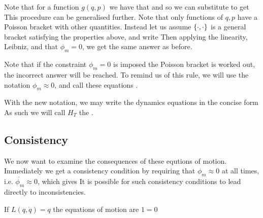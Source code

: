 \documentclass{article}
\begin{document}
Note that for a function $g(q,p)$ we have that 
and so we can substitute to get 
This procedure can be generalised further. Note that only functions of $q,p$ have a Poisson bracket with other quantities. Instead let us assume $\acomm[\cdot]{\cdot}$ is a general bracket satisfying the properties above, and write 
Then applying the linearity, Leibniz, and that $\phi_m = 0$, we get the same answer as before. 

\begin{remark}
Note that if the constraint $\phi_m = 0$ is imposed  the Poisson bracket is worked out, the incorrect answer will be reached. To remind us of this rule, we will use the notation $\phi_m \approx 0$, and call these equations . 
\end{remark}

With the new notation, we may write the dynamics equations in the concise form 
As such we will call $H_T$ the . \\
\subsection{Consistency}
We now want to examine the consequences of these equtions of motion. Immediately we get a consistency condition by requiring that $\phi_m\approx0$ at all times, i.e. $\dot{\phi_m}\approx0$, which gives 
It is possible for such consistency conditions to lead directly to inconsistencies.

\begin{example}
If $L(q,\dot{q}) = q$ the equations of motion are $1=0$
\end{example}
\end{document}
